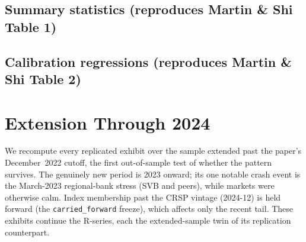 \documentclass[12pt]{article}
\newcommand{\exhibitbreak}{\clearpage}
\begin{document}
\subsection{Summary statistics (reproduces Martin \& Shi Table 1)}
\begin{table}[H]
\centering
\footnotesize
\caption[Summary statistics of the bounds]{\textbf{Reproduces Martin \& Shi Table
1.} The mean lower bound sits next to the mean realized crash frequency, while the
risk-neutral probability and the upper bound run well above both --- the paper's
central finding. Our cross-sectional means match the paper to within $0.007$; $T$ is
the number of formation months, $N$ the number of firms.}
\label{tab:table1}

\end{table}
\exhibitbreak

\subsection{Calibration regressions (reproduces Martin \& Shi Table 2)}
\begin{table}[H]
\centering
\footnotesize
\caption[Calibration regressions]{\textbf{Reproduces Martin \& Shi Table 2.} The
lower bound calibrates at $\beta \approx 1$, while the risk-neutral probability and
the upper bound are badly miscalibrated (slopes well below one), the formal
counterpart of Table~\ref{tab:table1}. Two-way clustered standard errors (Thompson
2011) in parentheses; block-bootstrap standard errors (Martin \& Wagner 2019, 2500
samples) in brackets.}
\label{tab:table2}
\resizebox{\textwidth}{!}{}
\end{table}
\exhibitbreak

\section{Extension Through 2024}
\label{sec:extension2025}
We recompute every replicated exhibit over the sample extended past the paper's
December~2022 cutoff, the first out-of-sample test of whether the pattern
survives. The genuinely new period is 2023 onward; its one notable crash event is
the March-2023 regional-bank stress (SVB and peers), while markets were otherwise
calm. Index membership past the CRSP vintage (2024-12) is held forward (the
\texttt{carried\_forward} freeze), which affects only the recent tail. These exhibits
continue the R-series, each the extended-sample twin of its replication counterpart.
\end{document}
